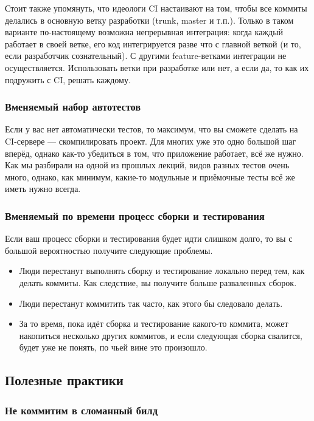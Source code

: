 \documentclass{../../text-style}
\begin{document}
Стоит также упомянуть, что идеологи CI настаивают на том, чтобы все коммиты делались в основную ветку разработки (trunk, master и т.п.). Только в таком варианте по-настоящему возможна непрерывная интеграция: когда каждый работает в своей ветке, его код интегрируется разве что с главной веткой (и то, если разработчик сознательный). С другими feature-ветками интеграции не осуществляется. Использовать ветки при разработке или нет, а если да, то как их подружить с CI, решать каждому.

\subsubsection{Вменяемый набор автотестов}

Если у вас нет автоматически тестов, то максимум, что вы сможете сделать на CI-сервере --- скомпилировать проект. Для многих уже это одно большой шаг вперёд, однако как-то убедиться в том, что приложение работает, всё же нужно. Как мы разбирали на одной из прошлых лекций, видов разных тестов очень много, однако, как минимум, какие-то модульные и приёмочные тесты всё же иметь нужно всегда.

\subsubsection{Вменяемый по времени процесс сборки и тестирования}

Если ваш процесс сборки и тестирования будет идти слишком долго, то вы с большой вероятностью получите следующие проблемы.

\begin{itemize}
    \item Люди перестанут выполнять сборку и тестирование локально перед тем, как делать коммиты. Как следствие, вы получите больше разваленных сборок.
    \item Люди перестанут коммитить так часто, как этого бы следовало делать.
    \item За то время, пока идёт сборка и тестирование какого-то коммита, может накопиться несколько других коммитов, и если следующая сборка свалится, будет уже не понять, по чьей вине это произошло.
\end{itemize}

\subsection{Полезные практики}

\subsubsection{Не коммитим в сломанный билд}
\end{document}

